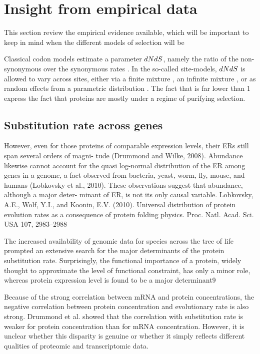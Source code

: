 \section{Insight from empirical data}

This section review the empirical evidence available, which will be important to keep in mind when the different models of selection will be 

Classical \gls{codon} models estimate a parameter $dNdS$, namely the ratio of the non-synonymous over the \gls{synonymous} rates \citep{Muse1994,Goldman1994}. In the so-called site-models, $dNdS$ is allowed to vary across sites, either via a finite mixture \citep{Yang2001}, an infinite mixture \citep{Huelsenbeck2006}, or as random effects from a parametric distribution \citep{lartillot_phylobayes_2013}. 
The fact that is far lower than 1 express the fact that proteins are mostly under a regime of purifying selection.

\subsection{Substitution rate across genes}

However, even for those proteins of comparable expression levels, their ERs still span several orders of magni- tude (Drummond and Wilke, 2008). Abundance likewise cannot account for the quasi log-normal distribution of the ER among genes in a genome, a fact observed from bacteria, yeast, worm, fly, mouse, and humans (Lobkovsky et al., 2010). These observations suggest that abundance, although a major deter- minant of ER, is not its only causal variable.
Lobkovsky, A.E., Wolf, Y.I., and Koonin, E.V. (2010). Universal distribution of protein evolution rates as a consequence of protein folding physics. Proc. Natl. Acad. Sci. USA 107, 2983–2988

The increased availability of genomic data for species across the tree of life prompted an extensive search for the major determinants of the protein \gls{substitution} rate. Surprisingly, the functional importance of a protein, widely thought to approximate the level of functional constraint, has only a minor role, whereas protein expression level is found to be a major determinant9 \citep{Zhang2015}

Because of the strong correlation between mRNA and protein concentrations, the negative correlation between protein concentration and evolutionary rate is also strong.
Drummond et al. showed that the correlation with \gls{substitution} rate is weaker for protein concentration than for mRNA concentration.
However, it is unclear whether this disparity is genuine or whether it simply reflects different qualities of proteomic and transcriptomic data.

